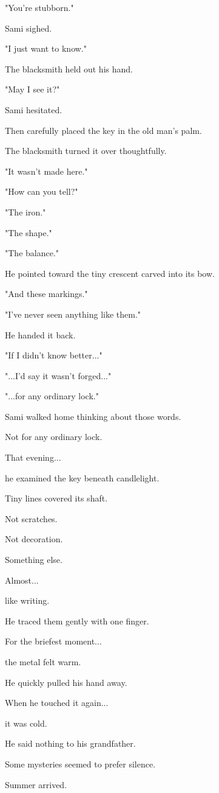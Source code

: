 \documentclass[12pt,openany]{book}
\begin{document}
"You're stubborn."

Sami sighed.

"I just want to know."

The blacksmith held out his hand.

"May I see it?"

Sami hesitated.

Then carefully placed the key in the old man's palm.

The blacksmith turned it over thoughtfully.

"It wasn't made here."

"How can you tell?"

"The iron."

"The shape."

"The balance."

He pointed toward the tiny crescent carved into its bow.

"And these markings."

"I've never seen anything like them."

He handed it back.

"If I didn't know better..."

"...I'd say it wasn't forged..."

"...for any ordinary lock."

Sami walked home thinking about those words.

Not for any ordinary lock.

That evening...

he examined the key beneath candlelight.

Tiny lines covered its shaft.

Not scratches.

Not decoration.

Something else.

Almost...

like writing.

He traced them gently with one finger.

For the briefest moment...

the metal felt warm.

He quickly pulled his hand away.

When he touched it again...

it was cold.

He said nothing to his grandfather.

Some mysteries seemed to prefer silence.

Summer arrived.
\end{document}
